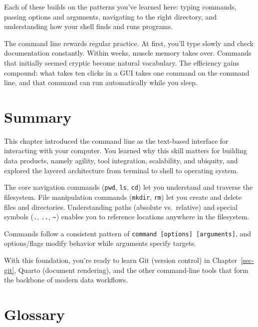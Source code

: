 \documentclass[
  letterpaper,
  DIV=11,
  numbers=noendperiod]{scrreprt}
\begin{document}
Each of these builds on the patterns you've learned here: typing
commands, passing options and arguments, navigating to the right
directory, and understanding how your shell finds and runs programs.

The command line rewards regular practice. At first, you'll type slowly
and check documentation constantly. Within weeks, muscle memory takes
over. Commands that initially seemed cryptic become natural vocabulary.
The efficiency gains compound: what takes ten clicks in a GUI takes one
command on the command line, and that command can run automatically
while you sleep.

\section{Summary}\label{summary-2}

This chapter introduced the command line as the text-based interface for
interacting with your computer. You learned why this skill matters for
building data products, namely agility, tool integration, scalability,
and ubiquity, and explored the layered architecture from terminal to
shell to operating system.

The core navigation commands (\texttt{pwd}, \texttt{ls}, \texttt{cd})
let you understand and traverse the filesystem. File manipulation
commands (\texttt{mkdir}, \texttt{rm}) let you create and delete files
and directories. Understanding paths (absolute vs.~relative) and special
symbols (\texttt{.}, \texttt{..}, \texttt{\textasciitilde{}}) enables
you to reference locations anywhere in the filesystem.

Commands follow a consistent pattern of
\texttt{command\ {[}options{]}\ {[}arguments{]}}, and options/flags
modify behavior while arguments specify targets.

With this foundation, you're ready to learn Git (version control) in
Chapter~\ref{sec-git}, Quarto (document rendering), and the other
command-line tools that form the backbone of modern data workflows.

\section{Glossary}\label{glossary-2}
\end{document}
